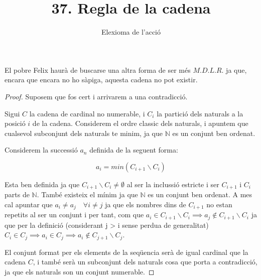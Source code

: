 \documentclass[12pt, a4papre]{article}
\author{Elexioma de l'acció}
\title{37. Regla de la cadena}
\date{}
\begin{document}
	\maketitle
	
	El pobre Felix haurà de buscarse una altra forma de ser més $M.D.L.R.$ ja que, encara que encara no ho sàpiga, aquesta cadena no pot existir.
	
	\begin{proof} Suposem que fos cert i arrivarem a una contradicció.
	
	Sigui $C$ la cadena de cardinal no numerable, i $C_i$  la partició dels naturals a la posició $i$ de la cadena. Considerem el ordre classic dels naturals, i apuntem que cualsevol subconjunt dels naturals te minim, ja que $\mathbb{N}$ es un conjunt ben ordenat.
	
	Considerem la successió $a_n$ definida de la seguent forma:
	
	\[
		a_i = min(C_{i+1}\backslash C_i)
	\]
	
	Esta ben definida ja que $C_{i+1}\backslash C_i \neq \emptyset$ al ser la inclussió estricte i ser $C_{i+1}$ i $C_{i}$ parts de $\mathbb{N}$. També existeix el mínim ja que $\mathbb{N}$ es un conjunt ben ordenat. A mes cal apuntar que $a_i \neq a_j \quad \forall i \neq j$ ja que els nombres dins de $C_{i+1}$ no estan repetits al ser un conjunt i per tant, com que $a_i \in C_{i+1}\backslash C_i \implies a_j \not\in C_{i+1}\backslash C_i$ ja que per la definició (considerant j > i sense perdua de generalitat) $C_i \in C_j \implies a_i \in C_j \implies a_i \not \in C_{j+1}\backslash C_j$.
	
	El conjunt format per els elements de la seqüencia serà de igual cardinal que la cadena $C$, i també serà un subconjunt dels naturals cosa que porta a contradicció, ja que els naturals son un conjunt numerable.
		
	\end{proof}
	
	
	
	
\end{document}
